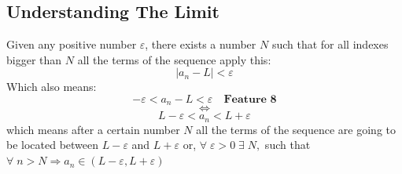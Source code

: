 \subsection{Understanding The Limit}
Given any positive number $\varepsilon$, there exists a number $N$ such that for all indexes bigger than $N$ all the terms of the sequence apply this:\\
\[
    |a_n-L|<\varepsilon
\]
Which also means:
\[
    -\varepsilon<a_n-L<\varepsilon \quad \textbf{Feature 8}
\]
\[
    \iff
\]
\[
    L-\varepsilon<a_n<L+\varepsilon
\]
which means after a certain number $N$ all the terms of the sequence are going to be located between $L-\varepsilon$ and $L+\varepsilon$ or, $\forall \; \varepsilon>0 \; \exists \; N,$ such that $\forall\; n>N \Longrightarrow a_n\in (L-\varepsilon,L+\varepsilon)$



